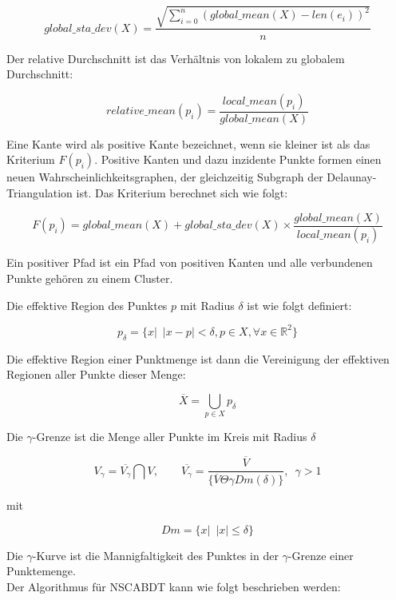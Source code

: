 \documentclass[11pt,ceqn]{book}
\begin{document}
$$global\_sta\_dev(X)= \frac{\sqrt{\sum\limits_{i=0}^n \left(global\_mean(X)-len(e_i)\right)^2}}{n}$$

Der relative Durchschnitt ist das Verhältnis von lokalem zu globalem Durchschnitt:

$$relative\_mean(p_i) = \frac{local\_mean(p_i)}{global\_mean(X)}$$

Eine Kante wird als positive Kante bezeichnet, wenn sie kleiner ist als das Kriterium $F(p_i)$. Positive Kanten und dazu inzidente Punkte formen einen neuen Wahrscheinlichkeitsgraphen, der gleichzeitig Subgraph der Delaunay-Triangulation ist. Das Kriterium berechnet sich wie folgt:

$$F(p_i) = global\_mean(X) + global\_sta\_dev(X) \times \frac{global\_mean(X)}{local\_mean(p_i)}$$

Ein positiver Pfad ist ein Pfad von positiven Kanten und alle verbundenen Punkte gehören zu einem Cluster.

Die effektive Region des Punktes $p$ mit Radius $\delta$ ist wie folgt definiert:

$$p_{\delta} = \{x|\enspace|x-p|<\delta, p\in X,\forall x\in \mathbb{R}^2\}$$

Die effektive Region einer Punktmenge ist dann die Vereinigung der effektiven Regionen aller Punkte dieser Menge:

$$\overline{X} = \bigcup_{p\in X} p_{\delta}$$

Die $\gamma$-Grenze ist die Menge aller Punkte im Kreis mit Radius $\delta$

$$V_\gamma = \overline{V_{\gamma}} \bigcap V, \qquad \overline{V_{\gamma}} = 
\frac{\overline{V}}
{\{\overline{V} \Theta \gamma Dm(\delta)\}} 
, \enspace \gamma>1$$


mit 

$$Dm = \{x|\enspace |x|\leqslant \delta\}$$

Die $\gamma$-Kurve ist die Mannigfaltigkeit des Punktes in der $\gamma$-Grenze einer Punktemenge.\\

Der Algorithmus für NSCABDT kann wie folgt beschrieben werden:
\end{document}
